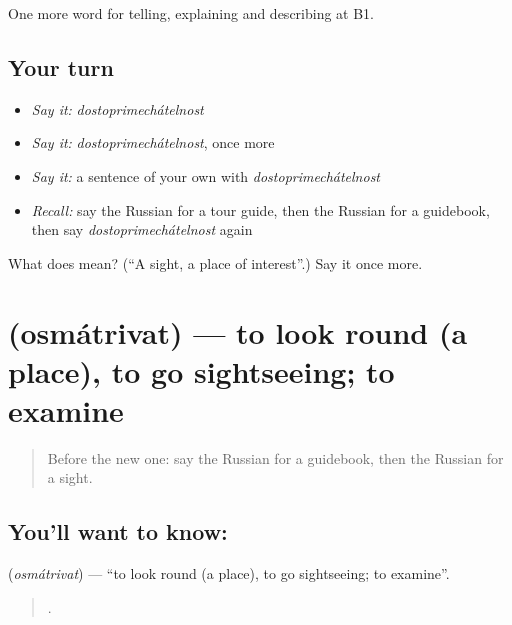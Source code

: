 \begin{grammarlens}[title={What you've built}]
One more word for telling, explaining and describing at B1.
\end{grammarlens}

\subsection*{Your turn}
\begin{itemize}
\raggedright
  \item \emph{Say it:} \emph{dostoprimechátelnost}
  \item \emph{Say it:} \emph{dostoprimechátelnost}, once more
  \item \emph{Say it:} a sentence of your own with \emph{dostoprimechátelnost}
  \item \emph{Recall:} say the Russian for a tour guide, then the Russian for a guidebook, then say \emph{dostoprimechátelnost} again
\end{itemize}

\begin{tcolorbox}[breakable,colback=teal!4,colframe=teal!35!black,title={Before you move on}]
What does  mean? (\textquotedblleft{}A sight, a place of interest\textquotedblright{}.) Say it once more.
\end{tcolorbox}
\section[\texorpdfstring{\ru{осматривать} (osmátrivat)}{осматривать (osmátrivat)}]{ (osmátrivat) — to look round (a place), to go sightseeing; to examine}

\label{lesson:RU-C442-osmatrivat}



\begin{quote}
Before the new one: say the Russian for a guidebook, then the Russian for a sight.
\end{quote}

\subsection*{You'll want to know: }
\textbf{} (\emph{osmátrivat}) — \textquotedblleft{}to look round (a place), to go sightseeing; to examine\textquotedblright{}.

\begin{quote}
     .
\end{quote}

